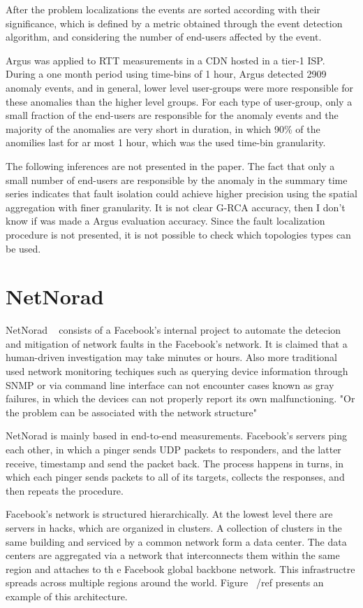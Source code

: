 After the problem localizations the events are sorted according with their
significance, which is defined by a metric obtained through the event detection
algorithm, and considering the number of end-users affected by the event.

Argus was applied to RTT measurements in a CDN hosted in a tier-1 ISP. During a
one month period using time-bins of 1 hour, Argus detected 2909
anomaly events, and in general, lower level user-groups were more responsible
for these anomalies than the higher level groups. For each type of user-group,
only a small fraction of the end-users are responsible for the anomaly events
and the majority of the
anomalies are very short in duration, in which 90\% of the anomilies last for
ar most 1 hour, which was the used time-bin granularity.

The following inferences are not presented in the paper. The fact that only a
small number of end-users are responsible by the anomaly in the summary time
series indicates that fault isolation could achieve higher precision using the
spatial aggregation with finer granularity. It is not clear G-RCA accuracy,
then I don't know if was made a Argus evaluation accuracy. Since the fault
localization  procedure is not presented, it is not possible to check which
topologies types can be used.

\section{NetNorad}

NetNorad ~\cite{netnorad} consists of a Facebook's internal project to
automate the detecion and mitigation of network faults in the Facebook's
network. It is claimed that a human-driven investigation may take minutes or
hours. Also more traditional used network monitoring techiques such as querying
device information through SNMP or via command line interface can not encounter
cases known as gray failures, in which the devices can not properly report its
own malfunctioning. "Or the problem can be associated with the network
structure"

NetNorad is mainly based in end-to-end measurements.
Facebook's servers ping each other, in which
a pinger sends UDP packets to responders, and the latter receive, timestamp
and send the packet back. The process happens in turns, in which each pinger
sends packets to all of its targets, collects the responses, and then repeats
the procedure.

Facebook's network is structured hierarchically. At the
lowest level there are servers in hacks, which are organized in
clusters. A collection of clusters in the same building and serviced by
a common network form a data center. The data centers are aggregated
via a network that interconnects them within the same region and attaches to th
e Facebook global backbone network. This infrastructre spreads across multiple
regions around the world. Figure ~/ref{} presents an example of this
architecture.

